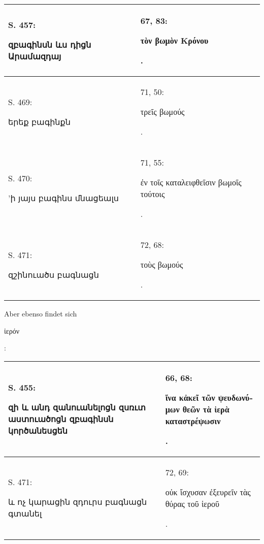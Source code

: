 \documentclass{article}
\begin{document}
{\begin{table}[H]
\begin{tabular}{p{45mm}|p{45mm}}
        S. 457: \begin{armenian}զբագինսն ևս դիցն Արամազդայ\end{armenian} & 67, 83: \begin{greek}τὸν βωμὸν Κρόνου\end{greek}.   \\ \hline
        S. 469: \begin{armenian}երեք բագինքն\end{armenian} & 71, 50: \begin{greek}τρεῖς βωμούς\end{greek}.   \\ \hline
        S. 470: \begin{armenian}'ի յայս բագինս մնացեալս\end{armenian} & 71, 55: \begin{greek}ἐν τοῖς καταλειφθεῖσιν βωμοῖς τούτοις\end{greek}.   \\ \hline
        S. 471: \begin{armenian}զշինուածս բագնացն\end{armenian} & 72, 68: \begin{greek}τοὺς βωμούς\end{greek}. \\ \hline
    \end{tabular}
\end{table}
\hspace*{5mm}Aber ebenso findet sich \begin{greek}ἱερόν\end{greek}:  
\begin{table}[H]
    \centering
    \tiny
    \begin{tabular}{p{45mm}|p{45mm}}
    \hline
        S. 455: \begin{armenian}զի և անդ զանուանելոցն զսռւտ աստուածոցն զբագինսն կործանեսցեն\end{armenian} & 66, 68: \begin{greek}ἵνα κἀκεῖ τῶν ψευδωνύμων θεῶν τὰ ἱερὰ καταστρέψωσιν\end{greek}.   \\ \hline
        S. 471: \begin{armenian}և ոչ կարացին զդուրս բագնացն գտանել\end{armenian} & 72, 69: \begin{greek}οὐκ ἴσχυσαν ἐξευρεῖν τὰς θύρας τοῦ ἱεροῦ\end{greek}. \\ \hline
    \end{tabular}

\end{table}}
\end{document}
